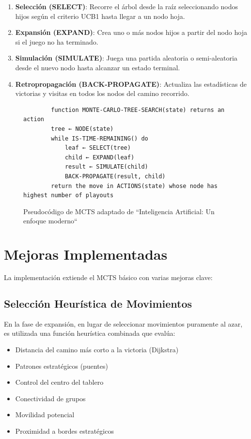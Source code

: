 \documentclass[a4paper, 12pt]{article}
\begin{document}
\begin{enumerate}
	\item \textbf{Selección (SELECT)}: Recorre el árbol desde la raíz seleccionando nodos hijos según el criterio UCB1 hasta llegar a un nodo hoja.
	\item \textbf{Expansión (EXPAND)}: Crea uno o más nodos hijos a partir del nodo hoja si el juego no ha terminado.
	\item \textbf{Simulación (SIMULATE)}: Juega una partida aleatoria o semi-aleatoria desde el nuevo nodo hasta alcanzar un estado terminal.
	\item \textbf{Retropropagación (BACK-PROPAGATE)}: Actualiza las estadísticas de victorias y visitas en todos los nodos del camino recorrido.
\end{enumerate}

\begin{figure}[h]
	\centering
	\begin{verbatim}
		function MONTE-CARLO-TREE-SEARCH(state) returns an action
		tree ← NODE(state)
		while IS-TIME-REMAINING() do
			leaf ← SELECT(tree)
			child ← EXPAND(leaf)
			result ← SIMULATE(child)
			BACK-PROPAGATE(result, child)
		return the move in ACTIONS(state) whose node has highest number of playouts
	\end{verbatim}
	\caption{Pseudocódigo de MCTS adaptado de ``Inteligencia Artificial: Un enfoque moderno``}
	\label{fig:mcts-pseudo}
\end{figure}


\newpage

\section{Mejoras Implementadas}
La implementación extiende el MCTS básico con varias mejoras clave:

\subsection{Selección Heurística de Movimientos}
En la fase de expansión, en lugar de seleccionar movimientos puramente al azar, es utilizada una función heurística combinada que evalúa:

\begin{itemize}
	\item Distancia del camino más corto a la victoria (Dijkstra)
	\item Patrones estratégicos (puentes)
	\item Control del centro del tablero
	\item Conectividad de grupos
	\item Movilidad potencial
	\item Proximidad a bordes estratégicos
\end{itemize}
\end{document}
